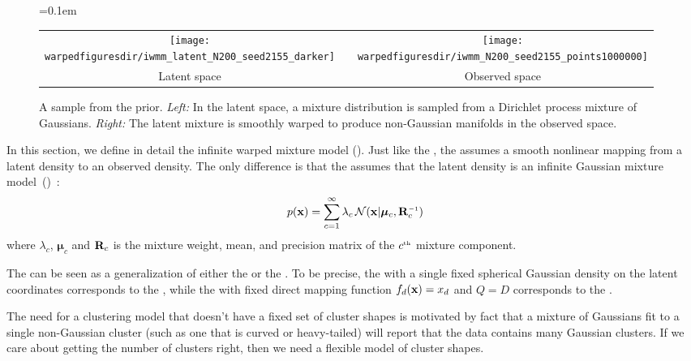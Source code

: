 \begin{figure}
\centering
\tabcolsep=0.1em
{\begin{tabular}{ccc}
\fbox{\texttt{[image: \\warpedfiguresdir/iwmm\_latent\_N200\_seed2155\_darker]}} &
\raisebox{5em}{$\rightarrow$} &
\fbox{\texttt{[image: \\warpedfiguresdir/iwmm\_N200\_seed2155\_points1000000]}}\\
Latent space & & Observed space \\
\end{tabular}}
\caption[A draw from the infinite warped mixture model prior]{
A sample from the \iwmm{} prior.
\emph{Left:} In the latent space, a mixture distribution is sampled from a Dirichlet process mixture of Gaussians.
\emph{Right:} The latent mixture is smoothly warped to produce non-Gaussian manifolds in the observed space.}
\label{fig:generative}
\end{figure}


In this section, we define in detail the infinite warped mixture model (\iwmm{}).
Just like the \gplvm{}, the \iwmm{} assumes a smooth nonlinear mapping from a latent density to an observed density.
The only difference is that the \iwmm{} assumes that the latent density is an infinite Gaussian mixture model~(\iGMM{})~\citep{rasmussen2000infinite}:
\begin{align}
p(\vx ) = \sum_{c=1}^{\infty} \lambda_c \, {\cal N}(\vx|\bm{\mu}_{c},\vR_{c}\inv)
\end{align}
where $\lambda_{c}$, $\bm{\mu}_{c}$ and $\mathbf{R}_{c}$ is the mixture weight, mean, and precision matrix of the $c^{\text{\tiny th}}$ mixture component.

The \iwmm{} can be seen as a generalization of either the \gplvm{} or the \iGMM{}.
To be precise, the \iwmm{} with a single fixed spherical Gaussian density on the latent coordinates corresponds to the \gplvm{}, while the \iwmm{} with fixed direct mapping function $f_{d}({\bf{x}})=x_{d}$ and 
$Q=D$ corresponds to the \iGMM{}.

The need for a clustering model that doesn't have a fixed set of cluster shapes is motivated by fact that
a mixture of Gaussians fit to a single non-Gaussian cluster (such as one that is curved or heavy-tailed) will report that the data contains many Gaussian clusters.
If we care about getting the number of clusters right, then we need a flexible model of cluster shapes.






